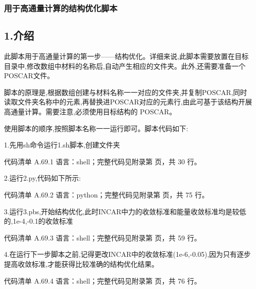 \documentclass[lang=cn,scheme=chinese,color=blue,device=normal,toc=onecol,math=cm]{elegantbook}
\begin{document}
\subsubsection{用于高通量计算的结构优化脚本}


\subsection{1.介绍}


此脚本用于高通量计算的第一步——结构优化。详细来说,此脚本需要放置在目标目录中,修改数组中材料的名称后,自动产生相应的文件夹。此外,还需要准备一个POSCAR文件。\par


脚本的原理是,根据数组创建与材料名称一一对应的文件夹,并复制POSCAR,同时读取文件夹名称中的元素,再替换进POSCAR对应的元素行,由此可基于该结构开展高通量计算。需要注意,必须使用目标结构的 POSCAR。\par


使用脚本的顺序,按照脚本名称一一运行即可。脚本代码如下:\par


1.先用sh命令运行1.sh脚本,创建文件夹\par


\begin{codeindexbox}{代码清单 A.69.1}
语言：shell；完整代码见附录第 \pageref{code:69:1} 页，共 30 行。
\end{codeindexbox}


2.运行2.py,代码如下所示:\par


\begin{codeindexbox}{代码清单 A.69.2}
语言：python；完整代码见附录第 \pageref{code:69:2} 页，共 75 行。
\end{codeindexbox}


3.运行3.pbs,开始结构优化,此时INCAR中力的收敛标准和能量收敛标准均是较低的,1e-4,-0.1的收敛标准\par


\begin{codeindexbox}{代码清单 A.69.3}
语言：shell；完整代码见附录第 \pageref{code:69:3} 页，共 59 行。
\end{codeindexbox}


4.在运行下一步脚本之前,记得更改INCAR中的收敛标准(1e-6,-0.05),因为只有逐步提高收敛标准,才能获得比较准确的结构优化结果。\par


\begin{codeindexbox}{代码清单 A.69.4}
语言：shell；完整代码见附录第 \pageref{code:69:4} 页，共 76 行。
\end{codeindexbox}
\end{document}
